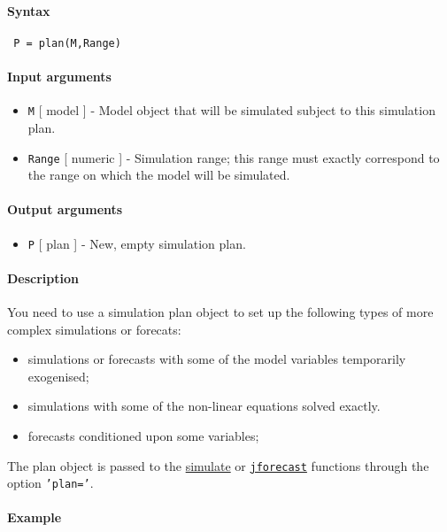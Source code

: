 


	\paragraph{Syntax}
 
 \begin{verbatim}
 P = plan(M,Range)
 \end{verbatim}
 
 \paragraph{Input arguments}
 
 \begin{itemize}
 \item
   \texttt{M} {[} model {]} - Model object that will be simulated subject
   to this simulation plan.
 \item
   \texttt{Range} {[} numeric {]} - Simulation range; this range must
   exactly correspond to the range on which the model will be simulated.
 \end{itemize}
 
 \paragraph{Output arguments}
 
 \begin{itemize}
 \item
   \texttt{P} {[} plan {]} - New, empty simulation plan.
 \end{itemize}
 
 \paragraph{Description}
 
 You need to use a simulation plan object to set up the following types
 of more complex simulations or forecats:
 
 \begin{itemize}
 \item
   simulations or forecasts with some of the model variables temporarily
   exogenised;
 \item
   simulations with some of the non-linear equations solved exactly.
 \item
   forecasts conditioned upon some variables;
 \end{itemize}
 
 The plan object is passed to the \href{model/simulate}{simulate} or
 \href{model/jforecast}{\texttt{jforecast}} functions through the option
 \texttt{'plan='}.
 
 \paragraph{Example}


